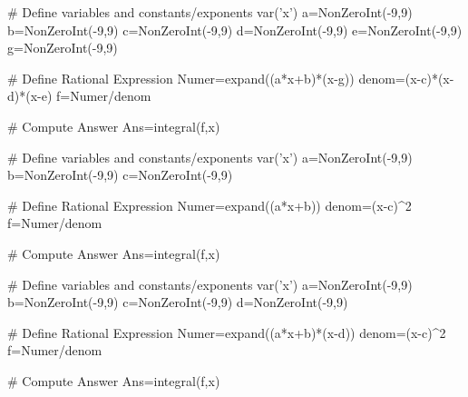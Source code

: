 \begin{sagesilent}
# Define variables and constants/exponents
var('x')
a=NonZeroInt(-9,9)
b=NonZeroInt(-9,9)
c=NonZeroInt(-9,9)
d=NonZeroInt(-9,9)
e=NonZeroInt(-9,9)
g=NonZeroInt(-9,9)


# Define Rational Expression
Numer=expand((a*x+b)*(x-g))
denom=(x-c)*(x-d)*(x-e)
f=Numer/denom

# Compute Answer
Ans=integral(f,x)
\end{sagesilent}



\begin{sagesilent}
# Define variables and constants/exponents
var('x')
a=NonZeroInt(-9,9)
b=NonZeroInt(-9,9)
c=NonZeroInt(-9,9)

# Define Rational Expression
Numer=expand((a*x+b))
denom=(x-c)^2
f=Numer/denom

# Compute Answer
Ans=integral(f,x)
\end{sagesilent}



\begin{sagesilent}
# Define variables and constants/exponents
var('x')
a=NonZeroInt(-9,9)
b=NonZeroInt(-9,9)
c=NonZeroInt(-9,9)
d=NonZeroInt(-9,9)

# Define Rational Expression
Numer=expand((a*x+b)*(x-d))
denom=(x-c)^2
f=Numer/denom

# Compute Answer
Ans=integral(f,x)
\end{sagesilent}

